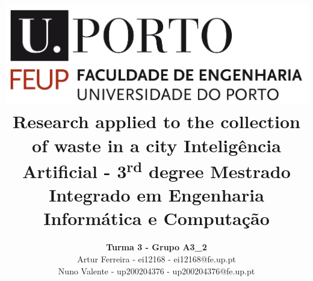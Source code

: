 \documentclass[a4paper]{article}
\begin{document}


\title{\includegraphics[scale=0.15]{feup_logo.png}
\linebreak\linebreak\linebreak\linebreak\linebreak
\Large\textbf{Research applied to the collection of waste in a city }
\linebreak\linebreak\linebreak\linebreak
\Large{Inteligência Artificial - 3\textsuperscript{rd} degree}
\linebreak
\Large{Mestrado Integrado em Engenharia Informática e Computação}\linebreak\linebreak\linebreak\linebreak
}
\author{\textbf{Turma 3 - Grupo A3\_2}\\
Artur Ferreira - ei12168 - ei12168@fe.up.pt\\
Nuno Valente - up200204376 - up200204376@fe.up.pt\\
\linebreak\linebreak \\
\linebreak\linebreak\linebreak
\linebreak\linebreak\vspace{1cm}}

\maketitle

\thispagestyle{empty}
\newpage
\tableofcontents 
\newpage
\end{document}
